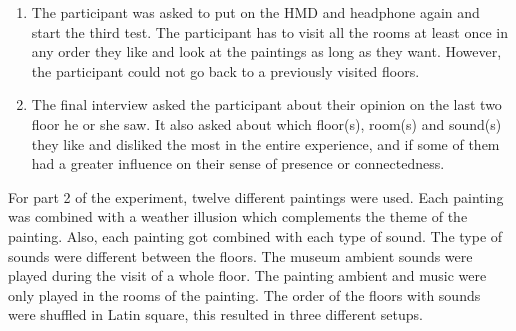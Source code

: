 \documentclass[a4paper]{article}
\begin{document}
\begin{enumerate}
\item The participant was asked to put on the HMD and headphone again and start the third test. The participant has to visit all the rooms at least once in any order they like and look at the paintings as long as they want. However, the participant could not go back to a previously visited floors. 
\item The final interview asked the participant about their opinion on the last two floor he or she saw. It also asked about which floor(s), room(s) and sound(s) they like and disliked the most in the entire experience, and if some of them had a greater influence on their sense of presence or connectedness. 
\end{enumerate}

For part 2 of the experiment, twelve different paintings were used. Each painting was combined with a weather illusion which complements the theme of the painting. Also, each painting got combined with each type of sound. The type of sounds were different between the floors. The museum ambient sounds were played during the visit of a whole floor. The painting ambient and music were only played in the rooms of the painting. The order of the floors with sounds were shuffled in Latin square, this resulted in three different setups.
\end{document}
